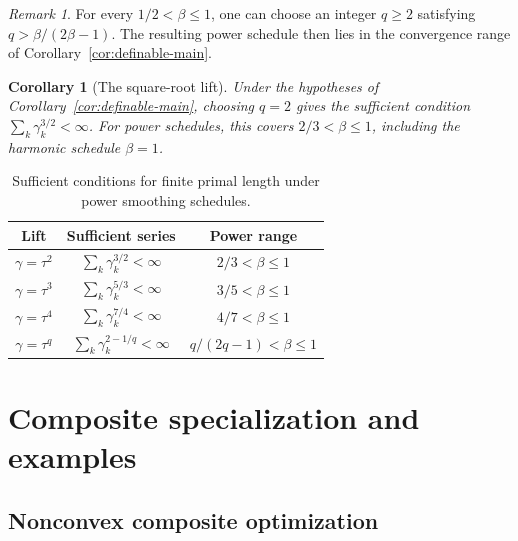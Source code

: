\documentclass[9pt]{article}
\numberwithin{equation}{section}
\newtheorem{corollary}[theorem]{Corollary}
\theoremstyle{definition}
\theoremstyle{remark}
\newtheorem{remark}[theorem]{Remark}
\begin{document}
\begin{remark}
For every $1/2<\beta\leq1$, one can choose an integer $q\geq2$
satisfying $q>\beta/(2\beta-1)$. The resulting power schedule then
lies in the convergence range of Corollary~\ref{cor:definable-main}.
\end{remark}

\begin{corollary}[The square-root lift]\label{cor:square-root}
Under the hypotheses of Corollary~\ref{cor:definable-main}, choosing
$q=2$ gives the sufficient condition $\sum_k\gamma_k^{3/2}<\infty$.
For power schedules, this covers $2/3<\beta\leq1$, including the
harmonic schedule $\beta=1$.
\end{corollary}

\begin{table}[htbp]
\centering
\caption{Sufficient conditions for finite primal length under power smoothing schedules.}\label{tab:schedules}
\begin{tabular}{ccc}
\toprule
Lift & Sufficient series & Power range\\
\midrule
$\gamma=\tau^2$ & $\sum_k\gamma_k^{3/2}<\infty$ & $2/3<\beta\leq1$\\
$\gamma=\tau^3$ & $\sum_k\gamma_k^{5/3}<\infty$ & $3/5<\beta\leq1$\\
$\gamma=\tau^4$ & $\sum_k\gamma_k^{7/4}<\infty$ & $4/7<\beta\leq1$\\
$\gamma=\tau^q$ & $\sum_k\gamma_k^{2-1/q}<\infty$
 & $q/(2q-1)<\beta\leq1$\\
\bottomrule
\end{tabular}
\end{table}



\section{Composite specialization and examples}
\label{sec:examples}
\subsection{Nonconvex composite optimization}
\end{document}
